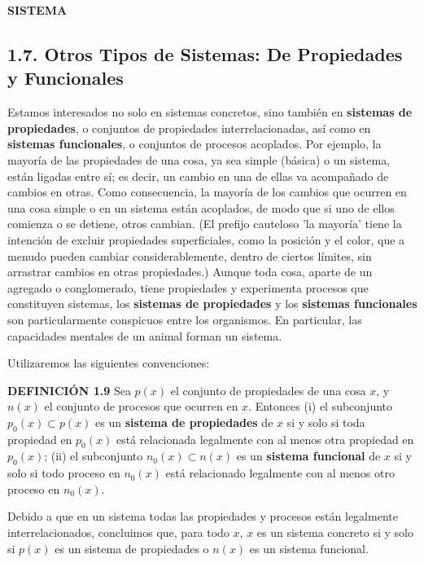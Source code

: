 \newpage
\fancyhf{}
\fancyhead[R]{\thepage} 
\begin{center}
{\fontsize{13}{16}\selectfont \textbf{SISTEMA}}
\end{center}
\vspace{0.5cm}

{\fontsize{13}{15}\selectfont
\subsection*{1.7. Otros Tipos de Sistemas: De Propiedades y Funcionales}
Estamos interesados no solo en sistemas concretos, sino también en \textbf{sistemas de propiedades}, o conjuntos de propiedades interrelacionadas, así como en \textbf{sistemas funcionales}, o conjuntos de procesos acoplados. Por ejemplo, la mayoría de las propiedades de una cosa, ya sea simple (básica) o un sistema, están ligadas entre sí; es decir, un cambio en una de ellas va acompañado de cambios en otras. Como consecuencia, la mayoría de los cambios que ocurren en una cosa simple o en un sistema están acoplados, de modo que si uno de ellos comienza o se detiene, otros cambian. (El prefijo cauteloso 'la mayoría' tiene la intención de excluir propiedades superficiales, como la posición y el color, que a menudo pueden cambiar considerablemente, dentro de ciertos límites, sin arrastrar cambios en otras propiedades.) Aunque toda cosa, aparte de un agregado o conglomerado, tiene propiedades y experimenta procesos que constituyen sistemas, los \textbf{sistemas de propiedades} y los \textbf{sistemas funcionales} son particularmente conspicuos entre los organismos. En particular, las capacidades mentales de un animal forman un sistema.

Utilizaremos las siguientes convenciones:

\textbf{DEFINICIÓN 1.9} Sea $p(x)$ el conjunto de propiedades de una cosa $x$, y $n(x)$ el conjunto de procesos que ocurren en $x$. Entonces
(i) el subconjunto $p_0(x) \subset p(x)$ es un \textbf{sistema de propiedades} de $x$ si y solo si toda propiedad en $p_0(x)$ está relacionada legalmente con al menos otra propiedad en $p_0(x)$;
(ii) el subconjunto $n_0(x) \subset n(x)$ es un \textbf{sistema funcional} de $x$ si y solo si todo proceso en $n_0(x)$ está relacionado legalmente con al menos otro proceso en $n_0(x)$.

Debido a que en un sistema todas las propiedades y procesos están legalmente interrelacionados, concluimos que, para todo $x$, $x$ es un sistema concreto si y solo si $p(x)$ es un sistema de propiedades o $n(x)$ es un sistema funcional.

}
